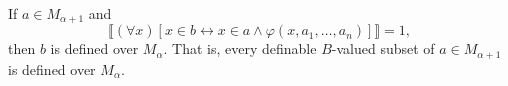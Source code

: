 If $a \in M_{\alpha+1}$ and
$$\llbracket (\forall x)[x \in b \leftrightarrow x \in a \land \varphi(x, a_1, \ldots, a_n)] \rrbracket = 1,$$
then $b$ is defined over $M_{\alpha}$. That is, every definable $B$-valued subset of $a \in M_{\alpha+1}$ is defined over $M_{\alpha}$.

